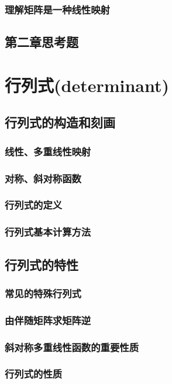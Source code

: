 \documentclass[zihao=-4,UTF8]{report}
\begin{document}
\subsection{理解矩阵是一种线性映射}

\section{第二章思考题}

\chapter{行列式(determinant)}
\thispagestyle{fancy} 
\section{行列式的构造和刻画}
\subsection{线性、多重线性映射}
\subsection{对称、斜对称函数}
\subsection{行列式的定义}
\subsection{行列式基本计算方法}

\section{行列式的特性}
\subsection{常见的特殊行列式}
\subsection{由伴随矩阵求矩阵逆}
\subsection{斜对称多重线性函数的重要性质}
\subsection{行列式的性质}
\end{document}
